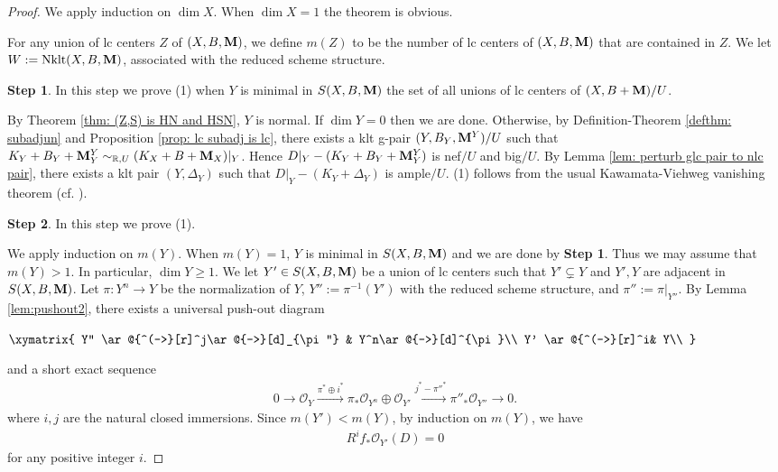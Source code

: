\documentclass[11pt]{amsart}
\numberwithin{equation}{section}
\newcommand{\Mm}{{\bf{M}}}
\newcommand{\Rr}{\mathbb{R}}
\newcommand{\Nklt}{\operatorname{Nklt}}
\newcommand{\Oo}{\mathcal{O}}
\theoremstyle{definition}
\theoremstyle{definition}
\theoremstyle{definition}
\begin{document}
\begin{proof}
We apply induction on $\dim X$. When $\dim X=1$ the theorem is obvious. 

For any union of lc centers $Z$ of $(X,B,\Mm)$, we define $m(Z)$ to be the number of lc centers of $(X,B,\Mm)$ that are contained in $Z$. We let $W:=\Nklt(X,B,\Mm)$, associated with the reduced scheme structure.

\medskip

\noindent\textbf{Step 1}. In this step we prove (1) when $Y$ is minimal in $S(X,B,\Mm)$ the set of all unions of lc centers of $(X,B+\Mm)/U$.

By Theorem \ref{thm: (Z,S) is HN and HSN}, $Y$ is normal. If $\dim Y=0$ then we are done. Otherwise, by Definition-Theorem \ref{defthm: subadjun} and Proposition \ref{prop: lc subadj is lc}, there exists a klt g-pair $(Y,B_Y,\Mm^{Y})/U$ such that $K_{Y}+B_{Y}+\Mm^{Y}_{Y}\sim_{\Rr,U}(K_X+B+\Mm_X)|_{Y}$. Hence $D|_Y-(K_{Y}+B_{Y}+\Mm^{Y}_{Y})$ is nef$/U$ and big$/U$. By Lemma \ref{lem: perturb glc pair to nlc pair}, there exists a klt pair $(Y,\Delta_Y)$ such that $D|_Y-(K_{Y}+\Delta_Y)$ is ample$/U$. (1) follows from the usual Kawamata-Viehweg vanishing theorem (cf. \cite[Theorem 1-2-7]{KMM87}).

\medskip

\noindent\textbf{Step 2}. In this step we prove (1). 

We apply induction on $m(Y)$. When $m(Y)=1$, $Y$ is minimal in $S(X,B,\Mm)$ and we are done by \textbf{Step 1}. Thus we may assume that $m(Y)>1$. In particular, $\dim Y\geq 1$. We let $Y'\in S(X,B,\Mm)$ be a union of lc centers such that $Y'\subsetneq Y$ and $Y',Y$ are adjacent in $S(X,B,\Mm)$.  Let $\pi: Y^n\rightarrow Y$ be the normalization of $Y$, $Y'':=\pi^{-1}(Y')$ with the reduced scheme structure, and $\pi'':=\pi|_{Y''}$. By Lemma \ref{lem:pushout2}, there exists a universal push-out diagram
\begin{center}
$\xymatrix{
Y'' \ar@{^(->}[r]^j\ar@{->}[d]_{\pi''} & Y^n\ar@{->}[d]^{\pi}\\
Y' \ar@{^(->}[r]^i& Y\\
}$
\end{center}
and a short exact sequence
\begin{align}\label{eq: short exact sequence in main theorem}
0\to \Oo_{Y}\xrightarrow{\pi^*\oplus i^*} \pi_*\Oo_{Y^n}\oplus\Oo_{Y'}\xrightarrow{j^*-\pi''^*} \pi''_*\Oo_{Y''}\to 0.
\end{align}
where $i,j$ are the natural closed immersions. Since $m(Y')<m(Y)$, by induction on $m(Y)$, we have
\begin{align}\label{eq3.1}
R^if_*\mathcal{O}_{Y'}(D)=0
\end{align}
for any positive integer $i$. 


\end{proof}
\end{document}
